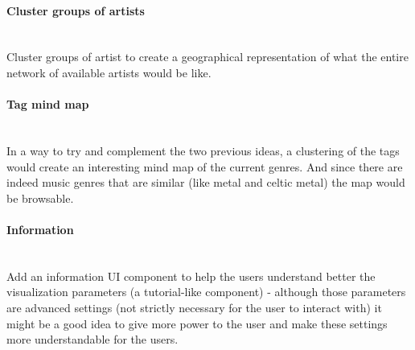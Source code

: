   \paragraph*{Cluster groups of artists} \hfill \\
  \indent Cluster groups of artist to create a geographical representation of what the entire network of available artists would be like. \\

  \paragraph*{Tag mind map} \hfill \\
  \indent In a way to try and complement the two previous ideas, a clustering of the tags would create an interesting mind map of the current genres.
  And since there are indeed music genres that are similar (like metal and celtic metal) the map would be browsable. \\

  \paragraph*{Information} \hfill \\
  \indent Add an information UI component to help the users understand better the visualization parameters (a tutorial-like component) - although those parameters are advanced settings (not strictly necessary for the user to interact with) it might be a good idea to give more power to the user and make these settings more understandable for the users.


